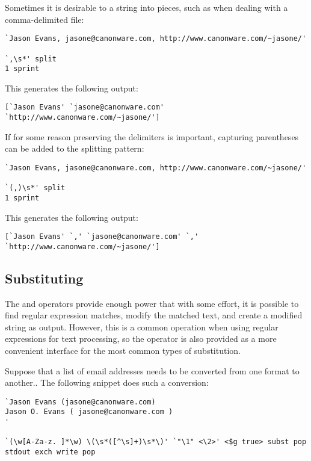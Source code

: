 Sometimes it is desirable to  a
string into pieces, such as when dealing with a comma-delimited file:

\begin{verbatim}
`Jason Evans, jasone@canonware.com, http://www.canonware.com/~jasone/'

`,\s*' split
1 sprint
\end{verbatim}

This generates the following output:

\begin{verbatim}
[`Jason Evans' `jasone@canonware.com' `http://www.canonware.com/~jasone/']
\end{verbatim}

If for some reason preserving the delimiters is important, capturing parentheses
can be added to the splitting pattern:

\begin{verbatim}
`Jason Evans, jasone@canonware.com, http://www.canonware.com/~jasone/'

`(,)\s*' split
1 sprint
\end{verbatim}

This generates the following output:

\begin{verbatim}
[`Jason Evans' `,' `jasone@canonware.com' `,' `http://www.canonware.com/~jasone/']
\end{verbatim}

\subsection{Substituting}

The  and
 operators provide enough power
that with some effort, it is possible to find regular expression matches, modify
the matched text, and create a modified string as output.  However, this is a
common operation when using regular expressions for text processing, so the
 operator is also provided as a
more convenient interface for the most common types of substitution.

Suppose that a list of email addresses needs to be converted from one format to
another..  The following snippet does such a conversion:

\begin{verbatim}
`Jason Evans (jasone@canonware.com)
Jason O. Evans ( jasone@canonware.com )
'

`(\w[A-Za-z. ]*\w) \(\s*([^\s]+)\s*\)' `"\1" <\2>' <$g true> subst pop
stdout exch write pop
\end{verbatim}

